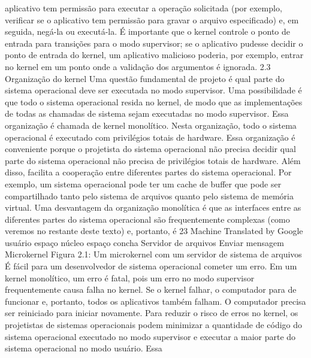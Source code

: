 aplicativo  tem  permissão  para  executar  a  operação  solicitada  (por  exemplo,  verificar  se  o  aplicativo  tem  permissão  para  
gravar  o  arquivo  especificado)  e,  em  seguida,  negá-la  ou  executá-la.  É  importante  que  o  kernel  controle  o  ponto  de  
entrada  para  transições  para  o  modo  supervisor;  se  o  aplicativo  pudesse  decidir  o  ponto  de  entrada  do  kernel,  um  
aplicativo  malicioso  poderia,  por  exemplo,  entrar  no  kernel  em  um  ponto  onde  a  validação  dos  argumentos  é  ignorada.
 2.3  Organização  do  kernel
 Uma  questão  fundamental  de  projeto  é  qual  parte  do  sistema  operacional  deve  ser  executada  no  modo  supervisor.  
Uma  possibilidade  é  que  todo  o  sistema  operacional  resida  no  kernel,  de  modo  que  as  implementações  de  todas  as  
chamadas  de  sistema  sejam  executadas  no  modo  supervisor.  Essa  organização  é  chamada  de  kernel  monolítico.
 Nesta  organização,  todo  o  sistema  operacional  é  executado  com  privilégios  totais  de  hardware.  Essa  organização  
é  conveniente  porque  o  projetista  do  sistema  operacional  não  precisa  decidir  qual  parte  do  sistema  operacional  não  
precisa  de  privilégios  totais  de  hardware.  Além  disso,  facilita  a  cooperação  entre  diferentes  partes  do  sistema  
operacional.  Por  exemplo,  um  sistema  operacional  pode  ter  um  cache  de  buffer  que  pode  ser  compartilhado  tanto  pelo  
sistema  de  arquivos  quanto  pelo  sistema  de  memória  virtual.
 Uma  desvantagem  da  organização  monolítica  é  que  as  interfaces  entre  as  diferentes  partes  do  sistema  operacional  
são  frequentemente  complexas  (como  veremos  no  restante  deste  texto)  e,  portanto,  é
 23
Machine Translated by Google
 usuário
 espaço
 núcleo
 espaço
 concha
 Servidor  de  arquivos
 Enviar  mensagem
 Microkernel
 Figura  2.1:  Um  microkernel  com  um  servidor  de  sistema  de  arquivos
 É  fácil  para  um  desenvolvedor  de  sistema  operacional  cometer  um  erro.  Em  um  kernel  monolítico,  um  erro  é  fatal,  pois  um  erro  
no  modo  supervisor  frequentemente  causa  falha  no  kernel.  Se  o  kernel  falhar,  o  computador  para  de  funcionar  e,  portanto,  todos  
os  aplicativos  também  falham.  O  computador  precisa  ser  reiniciado  para  iniciar  novamente.
 Para  reduzir  o  risco  de  erros  no  kernel,  os  projetistas  de  sistemas  operacionais  podem  minimizar  a  quantidade  de  código  do  
sistema  operacional  executado  no  modo  supervisor  e  executar  a  maior  parte  do  sistema  operacional  no  modo  usuário.  Essa  
